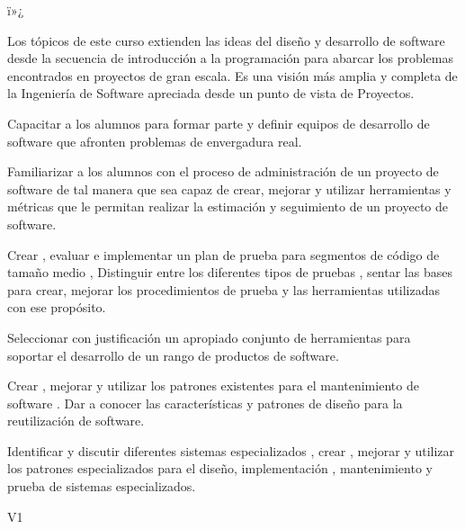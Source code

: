 ï»¿\begin{syllabus}


\begin{justification}
Los tópicos de este curso extienden las ideas del diseño y desarrollo de software desde la secuencia de introducción
a la programación para abarcar los problemas encontrados en proyectos de gran escala. Es una visión más amplia y
completa de la Ingenierí­a de Software apreciada desde un punto de vista de Proyectos.
\end{justification}

\begin{goals}
    \item Capacitar a los alumnos para formar parte y definir equipos de desarrollo de software que afronten problemas de envergadura real.
    \item Familiarizar a los alumnos con el proceso de administración de un proyecto de software de tal manera que sea capaz de crear, mejorar y utilizar herramientas y métricas que le permitan realizar la estimación y seguimiento de un proyecto de software.
    \item Crear , evaluar e implementar un plan de prueba para segmentos de código de tamaño medio , Distinguir entre los diferentes tipos de pruebas , sentar las bases para crear, mejorar los procedimientos de prueba y las herramientas utilizadas con ese propósito.
    \item Seleccionar con justificación un apropiado conjunto de herramientas para soportar el desarrollo de un rango de productos de software.
    \item Crear , mejorar y utilizar los patrones existentes para el mantenimiento de software . Dar a conocer las caracterí­sticas y patrones de diseño para la reutilización de software.
    \item Identificar y discutir diferentes sistemas especializados , crear , mejorar y utilizar los patrones especializados para el diseño, implementación , mantenimiento y prueba de sistemas especializados.
\end{goals}

\begin{outcomes}{V1}
    \item {}
    \item {}
	\item {}
	\item {}
	\item {}
\end{outcomes}


\end{syllabus}
